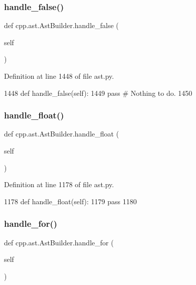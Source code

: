 \subsubsection{\texorpdfstring{handle\+\_\+false()}{handle\_false()}}
{\footnotesize\ttfamily def cpp.\+ast.\+Ast\+Builder.\+handle\+\_\+false (\begin{DoxyParamCaption}\item[{}]{self }\end{DoxyParamCaption})}



Definition at line 1448 of file ast.\+py.


\begin{DoxyCode}
1448     \textcolor{keyword}{def }handle\_false(self):
1449         \textcolor{keywordflow}{pass}  \textcolor{comment}{# Nothing to do.}
1450 
\end{DoxyCode}
\mbox{\label{classcpp_1_1ast_1_1AstBuilder_aabe3f6d67124181a8cd2665a4562d4f6}} 
\subsubsection{\texorpdfstring{handle\+\_\+float()}{handle\_float()}}
{\footnotesize\ttfamily def cpp.\+ast.\+Ast\+Builder.\+handle\+\_\+float (\begin{DoxyParamCaption}\item[{}]{self }\end{DoxyParamCaption})}



Definition at line 1178 of file ast.\+py.


\begin{DoxyCode}
1178     \textcolor{keyword}{def }handle\_float(self):
1179         \textcolor{keywordflow}{pass}
1180 
\end{DoxyCode}
\mbox{\label{classcpp_1_1ast_1_1AstBuilder_a0025c4d8ca779d69552e0947665eb1c4}} 
\subsubsection{\texorpdfstring{handle\+\_\+for()}{handle\_for()}}
{\footnotesize\ttfamily def cpp.\+ast.\+Ast\+Builder.\+handle\+\_\+for (\begin{DoxyParamCaption}\item[{}]{self }\end{DoxyParamCaption})}




